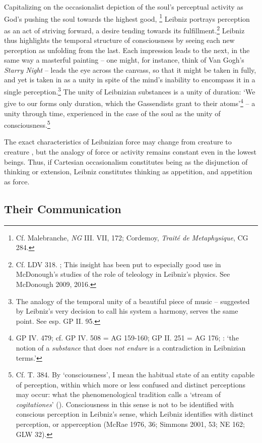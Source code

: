 \documentclass{article}
\begin{document}
Capitalizing on the occasionalist depiction of the soul's perceptual
activity as God's pushing the soul towards the highest good, \footnote{Cf.
  Malebranche, \emph{NG} III. VII, 172; Cordemoy, \emph{Traité de
  Metaphysique}, CG 284.} Leibniz portrays perception as an act of
striving forward, a desire tending towards its fulfillment.\footnote{Cf.
  LDV 318. \autocite{Jorgensen2015}; This insight has been put to especially good
  use in McDonough's studies of the role of teleology in Leibniz's
  physics. See McDonough 2009, 2016.} Leibniz thus highlights the
temporal structure of consciousness by seeing each new perception as
unfolding from the last. Each impression leads to the next, in the same
way a masterful painting -- one might, for instance, think of Van Gogh's
\emph{Starry Night} -- leads the eye across the canvass, so that it
might be taken in fully, and yet is taken in as a unity in spite of the
mind's inability to encompass it in a single perception.\footnote{The
  analogy of the temporal unity of a beautiful piece of music --
  suggested by Leibniz's very decision to call his system a harmony,
  serves the same point. See esp. GP II. 95.} The unity of Leibnizian
substances is a unity of duration: `We give to our forms only duration,
which the Gassendists grant to their atoms'\footnote{GP IV. 479; cf. GP
  IV. 508 = AG 159-160; GP II. 251 = AG 176; \autocite[870]{Whipple2010}: `the
  notion of a \emph{substance} that does \emph{not endure} is a
  contradiction in Leibnizian terms.'} -- a unity through time,
experienced in the case of the soul as the unity of
consciousness.\footnote{Cf. T. 384. By `consciousness', I mean the
  habitual state of an entity capable of perception, within which more
  or less confused and distinct perceptions may occur: what the
  phenomenological tradition calls a `stream of \emph{cogitationes}'
  (\autocite[31-33]{Husserl1960}). Consciousness in this sense is not to be
  identified with conscious perception in Leibniz's sense, which Leibniz
  identifies with distinct perception, or apperception (McRae 1976, 36;
  Simmons 2001, 53; NE 162; GLW 32).}

The exact characteristics of Leibnizian force may change from creature
to creature , but the analogy of force or activity remains constant even
in the lowest beings. Thus, if Cartesian occasionalism constitutes being
as the disjunction of thinking or extension, Leibniz constitutes
thinking as appetition, and appetition as force.

\subsection{Their Communication}
\end{document}
